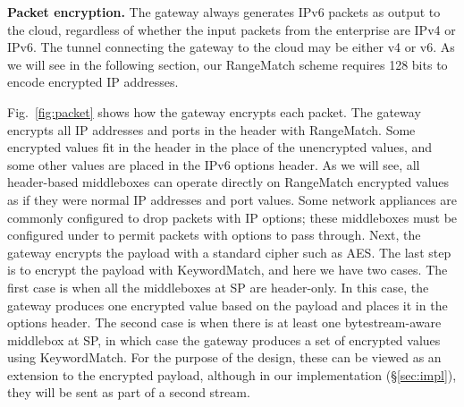 

\noindent\textbf{Packet encryption.}
The gateway always generates IPv6 packets as output to the cloud, regardless of whether the input packets from the enterprise are IPv4 or IPv6. The tunnel connecting the gateway to the cloud may be either v4 or v6.
As we will see in the following section, our RangeMatch scheme requires 128 bits to encode encrypted IP addresses.

Fig.~\ref{fig:packet} shows how the gateway encrypts each packet. 
The gateway encrypts all IP addresses and ports in the header with RangeMatch.
Some encrypted values fit 
in the header in the place of the unencrypted values, and
some other values are placed in the IPv6 options header. 
As we will see, all header-based middleboxes can operate directly on RangeMatch encrypted values as if they were normal IP addresses and port values.
Some network appliances are commonly configured to drop packets with IP options; these middleboxes must be configured under \sys to permit packets with \sys options to pass through.
Next, the gateway encrypts the payload  with a standard cipher such as AES.
The last step is to encrypt the payload with KeywordMatch, and here we have two cases.
The first case is when all the middleboxes at SP are header-only. In this case, the gateway produces one encrypted value based on the payload and places it in the options header. The second case is when there is at least one bytestream-aware middlebox at SP, in which case the gateway produces a set of encrypted values using KeywordMatch. For the purpose of the design, these can be viewed as an extension to the encrypted payload, although in our implementation (\S\ref{sec:impl}), they will be sent as part of a second stream.





